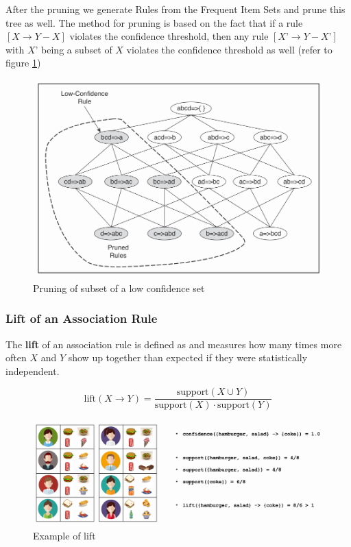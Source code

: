 \documentclass[a4paper, 11pt]{article}
\begin{document}
After the pruning we generate Rules from the Frequent Item Sets and prune this tree as well. The method for pruning is based on the fact that if a rule $[X \rightarrow Y - X]$ violates the confidence threshold, then any rule $[X’ \rightarrow Y - X’]$ with $X’$ being a subset of $X$ violates the confidence threshold as well (refer to figure \ref{fig:subsetpruning})

\begin{figure}[tbh!]
	\centering
	\includegraphics[width=0.7\linewidth, keepaspectratio]{Pictures/subset_pruning}
	\caption{Pruning of subset of a low confidence set}
	\label{fig:subsetpruning}
\end{figure}

\subsubsection{Lift of an Association Rule}

The \textbf{lift} of an association rule is defined as and measures how many times more often $X$ and $Y$ show up together than expected if they were statistically independent.

\begin{equation*}
	\text{lift}(X\rightarrow Y) = \frac{\text{support}(X\cup Y)}{\text{support}(X)\cdot\text{support}(Y)}
\end{equation*}

\begin{figure}[tbh!]
	\centering
	\includegraphics[width=0.7\linewidth, keepaspectratio]{Pictures/lift_association_rule}
	\caption{Example of lift}
	\label{fig:liftassociationrule}
\end{figure}
\end{document}
